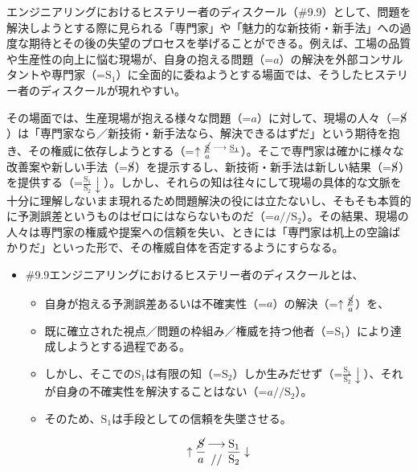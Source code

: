 エンジニアリングにおけるヒステリー者のディスクール（\#9.9）として、問題を解決しようとする際に見られる「専門家」や「魅力的な新技術・新手法」への過度な期待とその後の失望のプロセスを挙げることができる。例えば、工場の品質や生産性の向上に悩む現場が、自身の抱える問題（=\(a\)）の解決を外部コンサルタントや専門家（=\(\textrm{S}_1\)）に全面的に委ねようとする場面では、そうしたヒステリー者のディスクールが現れやすい。

その場面では、生産現場が抱える様々な問題（=\(a\)）に対して、現場の人々（=\(\cancel{\textrm{S}}\)）は「専門家なら／新技術・新手法なら、解決できるはずだ」という期待を抱き、その権威に依存しようとする（=\(\uparrow\frac{\cancel{\textrm{S}}}{a}\genfrac{}{}{0pt}{}{\longrightarrow}{}\frac{\textrm{S}_1}{}\)）。そこで専門家は確かに様々な改善案や新しい手法（=\(\cancel{\textrm{S}}\)）を提示するし、新技術・新手法は新しい結果（=\(\cancel{\textrm{S}}\)）を提供する（=\(\frac{\textrm{S}_1}{\textrm{S}_2}\downarrow\)）。しかし、それらの知は往々にして現場の具体的な文脈を十分に理解しないまま現れるため問題解決の役には立たないし、そもそも本質的に予測誤差というものはゼロにはならないものだ（=\(a//\textrm{S}_2\)）。その結果、現場の人々は専門家の権威や提案への信頼を失い、ときには「専門家は机上の空論ばかりだ」といった形で、その権威自体を否定するようにすらなる。

\begin{note}{}
  \begin{itemize}
    \tightlist
    \item{\#9.9}エンジニアリングにおけるヒステリー者のディスクールとは、
      \begin{itemize}
        \tightlist
        \item 自身が抱える予測誤差あるいは不確実性（=$a$）の解決（=$\uparrow\frac{\cancel{\textrm{S}}}{a}$）を、
        \item 既に確立された視点／問題の枠組み／権威を持つ他者（=$\textrm{S}_1$）により達成しようとする過程である。
        \item しかし、そこでの$\textrm{S}_1$は有限の知（=$\textrm{S}_2$）しか生みだせず（=$\frac{\textrm{S}_1}{\textrm{S}_2}\downarrow$）、それが自身の不確実性を解決することはない（=$a//\textrm{S}_2$）。
        \item そのため、$\textrm{S}_1$は手段としての信頼を失墜させる。
      \end{itemize}

$$
\uparrow\frac{\mathrm{\cancel{S}}}{a}\genfrac{}{}{0pt}{}{\longrightarrow}{//}\frac{\mathrm{S_1}}{\mathrm{S_2}}\downarrow
$$
  \end{itemize}
\end{note}

